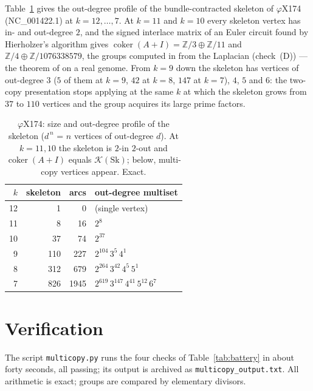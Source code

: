 \documentclass[11pt]{article}
\theoremstyle{plain}
\theoremstyle{definition}
\theoremstyle{remark}
\newcommand{\Z}{\mathbb{Z}}
\newcommand{\K}{\mathcal{K}}
\newcommand{\coker}{\operatorname{coker}}
\newcommand{\Sk}{\mathrm{Sk}}
\begin{document}
Table~\ref{tab:phix} gives the out-degree profile of the bundle-contracted skeleton of
$\varphi$X174 (NC\_001422.1) at $k=12,\dots,7$. At $k=11$ and $k=10$ every skeleton
vertex has in- and out-degree $2$, and the signed interlace matrix of an Euler circuit
found by Hierholzer's algorithm gives $\coker(A+I)=\Z/3\oplus\Z/11$ and
$\Z/4\oplus\Z/1076338579$, the groups computed in \cite{Bio3} from the Laplacian
(check~(D)) --- the theorem of \cite{MMN} on a real genome. From $k=9$ down the skeleton
has vertices of out-degree $3$ ($5$ of them at $k=9$, $42$ at $k=8$, $147$ at $k=7$),
$4$, $5$ and $6$: the two-copy presentation stops applying at the same $k$ at which the
skeleton grows from $37$ to $110$ vertices and the group acquires its large prime factors.

\begin{table}[ht]
\centering\small
\begin{tabular}{rrrl}
\toprule
$k$ & skeleton & arcs & out-degree multiset\\
\midrule
12 &   1 &    0 & (single vertex)\\
11 &   8 &   16 & $2^{8}$\\
10 &  37 &   74 & $2^{37}$\\
 9 & 110 &  227 & $2^{104}\,3^{5}\,4^{1}$\\
 8 & 312 &  679 & $2^{264}\,3^{42}\,4^{5}\,5^{1}$\\
 7 & 826 & 1945 & $2^{619}\,3^{147}\,4^{41}\,5^{12}\,6^{7}$\\
\bottomrule
\end{tabular}
\caption{$\varphi$X174: size and out-degree profile of the skeleton ($d^{\,n}$ = $n$
vertices of out-degree $d$). At $k=11,10$ the skeleton is $2$-in $2$-out and
$\coker(A+I)$ equals $\K(\Sk)$; below, multi-copy vertices appear. Exact.}
\label{tab:phix}
\end{table}

\section{Verification}\label{sec:battery}

The script \texttt{multicopy.py} runs the four checks of Table~\ref{tab:battery} in
about forty seconds, all passing; its output is archived as
\texttt{multicopy\_output.txt}. All arithmetic is exact; groups are compared by
elementary divisors.
\end{document}
